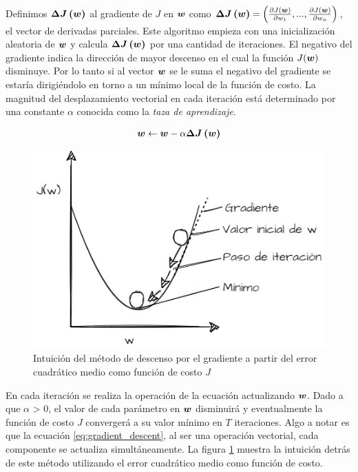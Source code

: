 Definimos $\boldsymbol{\Delta J\left( w \right)}$ al gradiente de $J$ en $\boldsymbol{w}$
como $\boldsymbol{\Delta J\left( \boldsymbol{w} \right)} = \left(\frac{\partial
J(\boldsymbol{w})}{\partial w_1}, ..., \frac{\partial J(\boldsymbol{w})}{\partial w_n}
\right)$, el vector de derivadas parciales. Este algoritmo empieza con una
inicialización aleatoria de $\boldsymbol{w}$ y calcula $\boldsymbol{\Delta J\left( w
\right)}$ por una cantidad de iteraciones. El negativo del gradiente indica la
dirección de mayor descenso en el cual la función $J(\boldsymbol{w})$ disminuye. Por
lo tanto si al vector $\boldsymbol{w}$ se le suma el negativo del gradiente se estaría
dirigiéndolo en torno a un mínimo local de la función de costo. La magnitud del
desplazamiento vectorial en cada iteración está determinado por una constante
$\alpha$ conocida como la \emph{taza de aprendizaje}.

\begin{align} \label{eq:gradient_descent}
    \boldsymbol{w} \leftarrow \boldsymbol{w} - \alpha \boldsymbol{\Delta J\left( w \right)}
\end{align}

\begin{figure}
    \centering
    \includegraphics[scale=0.5]{figures/gradient_descent_plot.png}
    \caption{Intuición del método de descenso por el gradiente a partir del error cuadrático medio como función de costo $J$}
    \label{fig:gradient_descent}
\end{figure}

En cada iteración se realiza la operación de la ecuación actualizando
$\boldsymbol{w}$. Dado a que $\alpha$ > 0, el valor de cada parámetro en $\boldsymbol{w}$
disminuirá y eventualmente la función de costo $J$ convergerá a su valor mínimo
en $T$ iteraciones. Algo a notar es que la ecuación \ref{eq:gradient_descent},
al ser una operación vectorial, cada componente se actualiza simultáneamente. La
figura \ref{fig:gradient_descent} muestra la intuición detrás de este método
utilizando el error cuadrático medio como función de costo.

